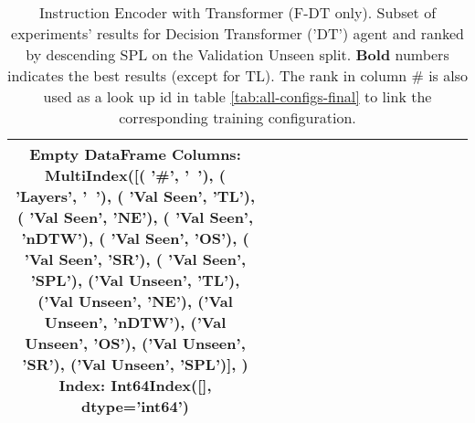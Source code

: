 \begin{table}
\centering
\caption{\label{tab:dt_instruction_encoding_full}Instruction Encoder with Transformer (F-DT only). Subset of experiments' results for Decision Transformer ('DT') agent and ranked by descending SPL on the Validation Unseen split. \textbf{Bold} numbers indicates the best results (except for TL). The rank in column \# is also used as a look up id in table \ref{tab:all-configs-final} to link the corresponding training configuration.}
\begin{tabular}{@{\hskip3pt}c@{\hskip3pt}c@{\hskip3pt}c@{\hskip3pt}c@{\hskip3pt}c@{\hskip3pt}c@{\hskip3pt}c@{\hskip3pt}c@{\hskip3pt}c@{\hskip3pt}c@{\hskip3pt}c@{\hskip3pt}c@{\hskip3pt}c@{\hskip3pt}c@{\hskip3pt}c}
\toprule
Empty DataFrame
Columns: MultiIndex([(        '\textbf{\#}',    '\textbf{~}'),
            (    '\textbf{Layers}',    '\textbf{~}'),
            (  '\textbf{Val Seen}',   '\textbf{TL}'),
            (  '\textbf{Val Seen}',   '\textbf{NE}'),
            (  '\textbf{Val Seen}', '\textbf{nDTW}'),
            (  '\textbf{Val Seen}',   '\textbf{OS}'),
            (  '\textbf{Val Seen}',   '\textbf{SR}'),
            (  '\textbf{Val Seen}',  '\textbf{SPL}'),
            ('\textbf{Val Unseen}',   '\textbf{TL}'),
            ('\textbf{Val Unseen}',   '\textbf{NE}'),
            ('\textbf{Val Unseen}', '\textbf{nDTW}'),
            ('\textbf{Val Unseen}',   '\textbf{OS}'),
            ('\textbf{Val Unseen}',   '\textbf{SR}'),
            ('\textbf{Val Unseen}',  '\textbf{SPL}')],
           )
Index: Int64Index([], dtype='int64') \\
\bottomrule
\end{tabular}
\end{table}
